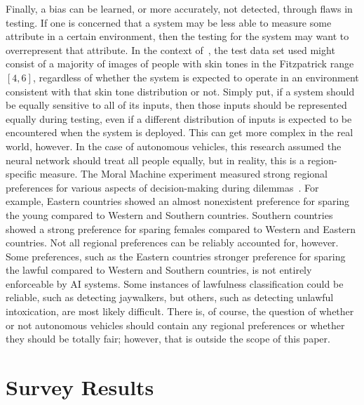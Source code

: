 \documentclass[paper=a4paper]{report}
\begin{document}
Finally, a bias can be learned, or more accurately, not detected, through flaws in testing. If one
is concerned that a system may be less able to measure some attribute in a certain environment, then
the testing for the system may want to overrepresent that attribute. In the context
of~\cite{wilson2019predictive}, the test data set used might consist of a majority of images of
people with skin tones in the Fitzpatrick range $[4, 6]$, regardless of whether the system is
expected to operate in an environment consistent with that skin tone distribution or not. Simply
put, if a system should be equally sensitive to all of its inputs, then those inputs should be
represented equally during testing, even if a different distribution of inputs is expected to be
encountered when the system is deployed. This can get more complex in the real world, however. In
the case of autonomous vehicles, this research assumed the neural network should treat all people
equally, but in reality, this is a region-specific measure. The Moral Machine experiment measured
strong regional preferences for various aspects of decision-making during
dilemmas~\cite{awad2018moral}. For example, Eastern countries showed an almost nonexistent
preference for sparing the young compared to Western and Southern countries. Southern countries
showed a strong preference for sparing females compared to Western and Eastern countries. Not all
regional preferences can be reliably accounted for, however. Some preferences, such as the Eastern
countries stronger preference for sparing the lawful compared to Western and Southern countries, is
not entirely enforceable by AI systems. Some instances of lawfulness classification could be
reliable, such as detecting jaywalkers, but others, such as detecting unlawful intoxication, are
most likely difficult. There is, of course, the question of whether or not autonomous vehicles
should contain any regional preferences or whether they should be totally fair; however, that is
outside the scope of this paper.

\FloatBarrier
\section{Survey Results}
\end{document}
